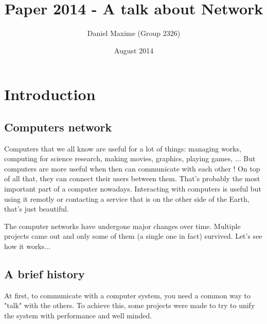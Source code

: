 \documentclass{article}
\title{Paper 2014 - A talk about Network}
\author{Daniel Maxime (Group 2326)}
\date{August 2014}
\begin{document}
\maketitle
\newpage

\tableofcontents
\clearpage

%
% 
% 
% 
%


\section{Introduction}
	\subsection{Computers network}
	
	Computers that we all know are useful for a lot of things: managing works, computing for science research,
	making movies, graphics, playing games, ... But computers are more useful when then can communicate with each other !
	On top of all that, they can connect their users between them. That's probably the most important part of a
	computer nowadays. Interacting with computers is useful but using it remotly or contacting a service that
	is on the other side of the Earth, that's just beautiful.
	
	The computer networks have undergone major changes over time. Multiple projects came out and
	only some of them (a single one in fact) survived. Let's see how it works...
	
	\subsection{A brief history}
	
	At first, to communicate with a computer system, you need a common way to "talk" with the others. To achieve
	this, some projects were made to try to unify the system with performance and well minded.
	
\end{document}
